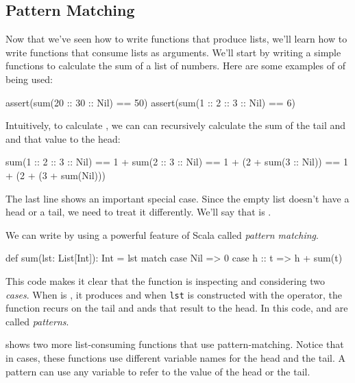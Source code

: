 \documentclass{book}
\begin{document}
\subsection{Pattern Matching}

Now that we've seen how to write functions that produce lists, we'll
learn how to write functions that consume lists as arguments. We'll
start by writing a simple functions to calculate the sum of a list of numbers.
Here are some examples of of  being used:
%
\begin{scalacode}
assert(sum(20 :: 30 :: Nil) == 50)
assert(sum(1 :: 2 :: 3 :: Nil) == 6)
\end{scalacode}

Intuitively, to calculate , we can
can recursively calculate the sum of the tail and and that value to the
head:
\begin{scalacode}
   sum(1 :: 2 :: 3 :: Nil)
== 1 + sum(2 :: 3 :: Nil)
== 1 + (2 + sum(3 :: Nil))
== 1 + (2 + (3 + sum(Nil)))
\end{scalacode}
%
The last line shows an important special case. Since the empty list
doesn't have a head or a tail, we need to treat it differently. We'll say
that  is .

We can write  by using a powerful feature of
Scala called \emph{pattern matching}.
%
\begin{scalacode}
def sum(lst: List[Int]): Int = {
  lst match {
    case Nil => 0
    case h :: t => h + sum(t)
  }
}
\end{scalacode}
%
This code makes it clear that the function is inspecting 
and considering two \emph{cases}. When  is ,
it produces  and when \lstinline{lst} is constructed with
the \scalainline{::} operator, the function recurs on the tail and ands
that result to the head. In this code,
 and  are called \emph{patterns}.

 shows two more list-consuming functions that
use pattern-matching. Notice that in \scalainline{::} cases, these functions
use different variable names for the head and the tail. A pattern can use
any variable to refer to the value of the head or the tail.
\end{document}
